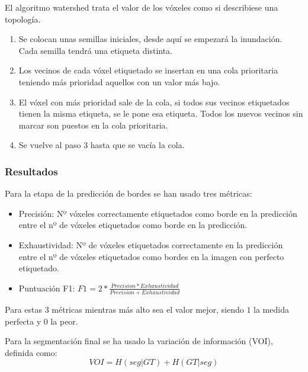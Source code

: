 El algoritmo watershed trata el valor de los vóxeles como si describiese una topología.
\begin{enumerate}
\item Se colocan unas semillas iniciales, desde aquí se empezará la inundación. Cada semilla tendrá una etiqueta distinta.
\item Los vecinos de cada vóxel etiquetado se insertan en una cola prioritaria teniendo más prioridad aquellos con un valor más bajo.
\item El vóxel con más prioridad sale de la cola, si todos sus vecinos etiquetados tienen la misma etiqueta, se le pone esa etiqueta. Todos los nuevos vecinos sin marcar son puestos en la cola prioritaria.
\item Se vuelve al paso 3 hasta que se vacía la cola.
\end{enumerate}

\subsubsection{Resultados}


Para la etapa de la predicción de bordes se han usado tres métricas:
\begin{itemize}
\item Precisión: Nº vóxeles correctamente etiquetados como borde en la predicción entre el nº de vóxeles etiquetados como borde en la predicción.
\item Exhaustividad: Nº de vóxeles etiquetados correctamente en la predicción entre el nº de vóxeles etiquetados como bordes en la imagen con perfecto etiquetado.
\item Puntuación F1: $F1=2*\frac{Precision * Exhaustividad}{Precision+Exhaustividad}$
\end{itemize}

Para estas 3 métricas mientras más alto sea el valor mejor, siendo $1$ la medida perfecta y $0$ la peor.

Para la segmentación final se ha usado la variación de información (VOI), definida como:
\begin{equation}
VOI = H(seg|GT) + H(GT|seg)
\end{equation}

